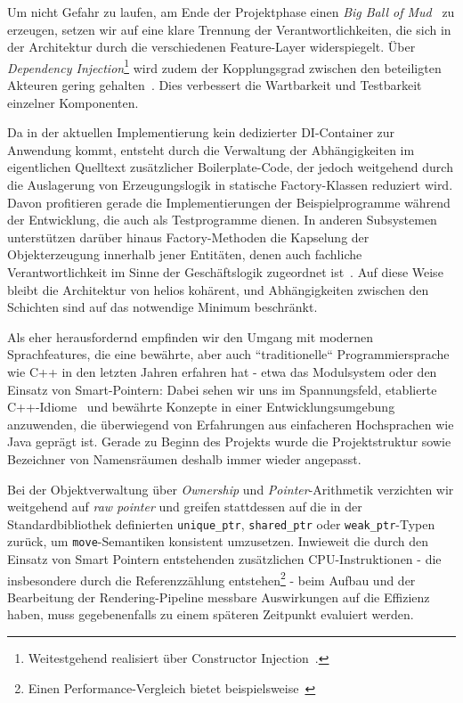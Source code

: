 Um nicht Gefahr zu laufen, am Ende der Projektphase einen \textit{Big Ball of Mud}~\cite[]{FY99} zu erzeugen, setzen wir auf eine klare Trennung der Verantwortlichkeiten, die sich in der Architektur durch die verschiedenen Feature-Layer widerspiegelt.
Über \textit{Dependency Injection}\footnote{
    Weitestgehend realisiert über Constructor Injection~\cite[]{FowlerDI}.
} wird zudem der Kopplungsgrad zwischen den beteiligten Akteuren gering gehalten~\cite[]{SZ10}.
Dies verbessert die Wartbarkeit und Testbarkeit einzelner Komponenten.\par
Da in der aktuellen Implementierung kein dedizierter DI-Container zur Anwendung kommt, entsteht durch die Verwaltung der Abhängigkeiten im eigentlichen Quelltext zusätzlicher Boilerplate-Code, der jedoch weitgehend durch die Auslagerung von Erzeugungslogik in statische Factory-Klassen reduziert wird.
Davon profitieren gerade die Implementierungen der Beispielprogramme während der Entwicklung, die auch als Testprogramme dienen.
In anderen Subsystemen unterstützen darüber hinaus Factory-Methoden die Kapselung der Objekterzeugung innerhalb jener Entitäten, denen auch fachliche Verantwortlichkeit im Sinne der Geschäftslogik zugeordnet ist~\cite[139 f.]{Eva03}.
Auf diese Weise bleibt die Architektur von helios kohärent, und Abhängigkeiten zwischen den Schichten sind auf das notwendige Minimum beschränkt.
\par

Als eher herausfordernd empfinden wir den Umgang mit modernen Sprachfeatures, die eine bewährte, aber auch ``traditionelle`` Programmiersprache wie C++ in den letzten Jahren erfahren hat - etwa das Modulsystem oder den Einsatz von Smart-Pointern: Dabei sehen wir uns im Spannungsfeld, etablierte C++-Idiome~\cite[]{IdiomaticCpp} und bewährte Konzepte in einer Entwicklungsumgebung anzuwenden, die überwiegend von Erfahrungen aus einfacheren Hochsprachen wie Java geprägt ist.
Gerade zu Beginn des Projekts wurde die Projektstruktur sowie Bezeichner von Namensräumen deshalb immer wieder angepasst.\par

Bei der Objektverwaltung über \textit{Ownership} und \textit{Pointer}-Arithmetik verzichten wir weitgehend auf \textit{raw pointer} und greifen stattdessen auf die in der Standardbibliothek definierten \texttt{unique\_ptr}, \texttt{shared\_ptr} oder \texttt{weak\_ptr}-Typen zurück, um \texttt{move}-Semantiken konsistent umzusetzen.
Inwieweit die durch den Einsatz von Smart Pointern entstehenden zusätzlichen CPU-Instruktionen - die insbesondere durch die Referenzzählung entstehen\footnote{Einen Performance-Vergleich bietet beispielsweise~\cite[]{Val25}} - beim Aufbau und der Bearbeitung der Rendering-Pipeline messbare Auswirkungen auf die Effizienz haben, muss gegebenenfalls zu einem späteren Zeitpunkt evaluiert werden.\par

